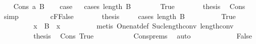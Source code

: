 \begin{isabellebody}
\ \ \isamarkupfalse%
\ {\isacharparenleft}{\kern0pt}Cons\ a\ B{\isacharparenright}{\kern0pt}\isanewline
\ \ \isamarkupfalse%
\ {\isacharquery}{\kern0pt}case\isanewline
\ \ \isamarkupfalse%
{\isacharparenleft}{\kern0pt}cases\ {\isachardoublequoteopen}length\ B\ {\isacharequal}{\kern0pt}\ {}{\isachardoublequoteclose}{\isacharparenright}{\kern0pt}\isanewline
\ \ \ \ \isamarkupfalse%
\ True\isanewline
\ \ \ \ \isamarkupfalse%
\ \isamarkupfalse%
\ {\isacharquery}{\kern0pt}thesis\ \isamarkupfalse%
\ Cons{\isacharparenleft}{\kern0pt}{}{\isacharparenright}{\kern0pt}\ \isamarkupfalse%
\ simp\isanewline
\ \ \isamarkupfalse%
\isanewline
\ \ \ \ \isamarkupfalse%
\ cF{\isacharcolon}{\kern0pt}False\isanewline
\ \ \ \ \isamarkupfalse%
\ \isamarkupfalse%
\ {\isacharquery}{\kern0pt}thesis\isanewline
\ \ \ \ \isamarkupfalse%
{\isacharparenleft}{\kern0pt}cases\ {\isachardoublequoteopen}length\ B\ {\isacharequal}{\kern0pt}\ {}{\isachardoublequoteclose}{\isacharparenright}{\kern0pt}\isanewline
\ \ \ \ \ \ \isamarkupfalse%
\ True\isanewline
\ \ \ \ \ \ \isamarkupfalse%
\ \isamarkupfalse%
\ x\ \ {\isachardoublequoteopen}B\ {\isacharequal}{\kern0pt}\ {\isacharbrackleft}{\kern0pt}x{\isacharbrackright}{\kern0pt}{\isachardoublequoteclose}\isanewline
\ \ \ \ \ \ \ \ \isamarkupfalse%
\ {\isacharparenleft}{\kern0pt}metis\ One{\isacharunderscore}{\kern0pt}nat{\isacharunderscore}{\kern0pt}def\ Suc{\isacharunderscore}{\kern0pt}length{\isacharunderscore}{\kern0pt}conv\ length{\isacharunderscore}{\kern0pt}{}{\isacharunderscore}{\kern0pt}conv{\isacharparenright}{\kern0pt}\isanewline
\ \ \ \ \ \ \isamarkupfalse%
\ \isamarkupfalse%
\ {\isacharquery}{\kern0pt}thesis\ \isamarkupfalse%
\ Cons{\isacharparenleft}{\kern0pt}{}{\isacharparenright}{\kern0pt}\ True\ \isanewline
\ \ \ \ \ \ \ \ \isamarkupfalse%
\ Cons{\isachardot}{\kern0pt}prems{\isacharparenleft}{\kern0pt}{}{\isacharparenright}{\kern0pt}\ \isamarkupfalse%
\ auto\isanewline
\ \ \ \ \isamarkupfalse%
\isanewline
\ \ \ \ \ \ \isamarkupfalse%
\ False\isanewline

\end{isabellebody}
